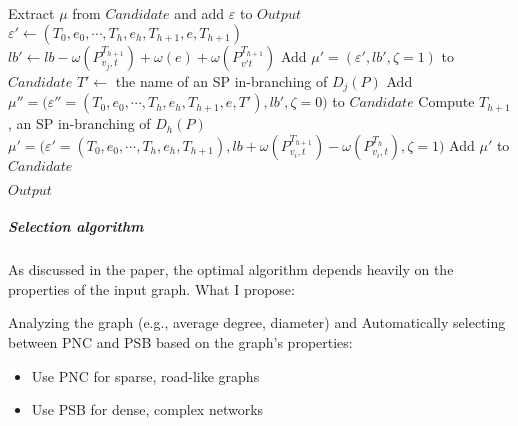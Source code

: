 \begin{itemize}
\begin{algorithm}[H]
\begin{algorithmic}[1]
                  \State Extract \(\mu\) from \(Candidate\) and add \(\varepsilon\) to \(Output\)
                  \State \(\varepsilon' \gets (T_0, e_0, \cdots, T_h, e_h, T_{h+1}, e, T_{h+1})\)
                  \State \(lb' \gets lb - \omega(P^{T_{h+1}}_{v_j,t}) + \omega(e) + \omega(P^{T_{h+1}}_{v't})\)
                  \State Add \(\mu' = (\varepsilon', lb', \zeta = 1)\) to \(Candidate\)
                  \Else
                  \State \(T' \gets\) the name of an SP in-branching of \(D_j(P)\) 
                  \State Add \(\mu'' = \big(\varepsilon'' = (T_0, e_0, \cdots, T_h, e_h, T_{h+1}, e, T'), lb', \zeta = 0\big)\) to \(Candidate\)
                  \EndIf
                  \EndFor
                  \Else
                  \State Compute \(T_{h+1}\), an SP in-branching of \(D_h(P)\)
                  \EndIf
                  \State \(\mu' = \big(\varepsilon' = (T_0, e_0, \cdots, T_h, e_h, T_{h+1}), lb + \omega(P^{T_{h+1}}_{v_i,t}) - \omega(P^{T_h}_{v_i,t}), \zeta = 1\big)\)
                  \State Add \(\mu'\) to \(Candidate\)
                  \EndIf
                  \EndWhile

                  \State \Return \(Output\)
              \end{algorithmic}
          \end{algorithm}
\end{itemize}

\subparagraph{Selection algorithm} As discussed in the paper, the optimal algorithm depends heavily on the
properties of the input graph. What I propose:

Analyzing the graph (e.g., average degree, diameter) and Automatically
selecting between PNC and PSB based on the graph’s properties:
\begin{itemize}
    \item Use PNC for sparse, road-like graphs
    \item Use PSB for dense, complex networks
\end{itemize}

